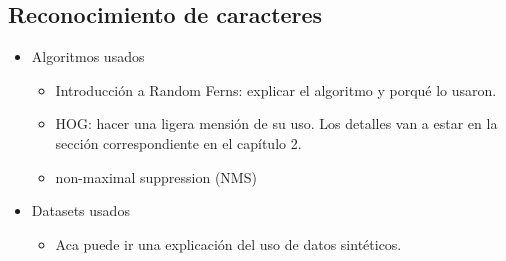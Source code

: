 \subsection{Reconocimiento de caracteres}

	\begin{itemize}
		\item Algoritmos usados
			\begin{itemize}
				\item Introducción a Random Ferns: explicar el algoritmo y porqué lo usaron.
				\item HOG: hacer una ligera mensión de su uso. Los detalles van a estar en la sección correspondiente en el capítulo 2.
				\item non-maximal suppression (NMS)
			\end{itemize}
		\item Datasets usados
			\begin{itemize}
				\item Aca puede ir una explicación del uso de datos sintéticos.			
			\end{itemize}			 
	\end{itemize}